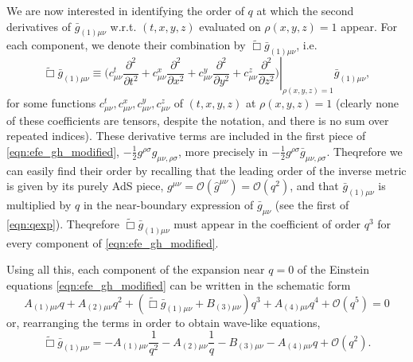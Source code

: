 \documentclass[a4paper,11pt]{article}
\begin{document}
We are now interested in identifying the order of $q$ at which the second derivatives of $ \bar{g}_{(1) \mu \nu}$ w.r.t. $(t,x,y,z)$ evaluated on $\rho(x,y,z)=1$ appear.
For each component, we denote their combination by $\tilde{\Box}\bar{g}_{(1)\mu\nu}$, i.e. 
\begin{equation}
\tilde{\Box}\bar{g}_{(1)\mu\nu}\equiv\left.\biggl(c^t_{\mu\nu}\frac{\partial^2}{\partial t^2}+c^x_{\mu\nu}\frac{\partial^2}{\partial x^2}+c^y_{\mu\nu}\frac{\partial^2}{\partial y^2}+c^z_{\mu\nu}\frac{\partial^2}{\partial z^2}\biggr)\right |_{\rho(x,y,z)=1}\bar{g}_{(1)\mu\nu},
\end{equation}
for some functions $c^t_{\mu\nu},c^x_{\mu\nu},c^y_{\mu\nu},c^z_{\mu\nu}$ of $(t,x,y,z)$ at $\rho(x,y,z)=1$ (clearly none of these coefficients are tensors, despite the notation, and there is no sum over repeated indices).
These derivative terms are included in the first piece of \eqref{eqn:efe_gh_modified}, $-\frac{1}{2}g^{\rho \sigma} g_{\mu \nu, \rho \sigma}$, more precisely in $-\frac{1}{2}g^{\rho \sigma} \bar{g}_{\mu \nu, \rho \sigma}$.
Theqrefore we can easily find their order by recalling that the leading order of the inverse metric is given by its purely AdS piece, $g^{\mu\nu}=\mathcal{O}(\hat{g}^{\mu\nu})=\mathcal{O}(q^{2})$, and that $\bar{g}_{(1)\mu\nu}$ is multiplied by $q$ in the near-boundary expression of $\bar{g}_{\mu\nu}$ (see the first of \eqref{eqn:qexp}). Theqrefore $\tilde{\Box}\bar{g}_{(1)\mu\nu}$ must appear in the coefficient of order $q^{3}$ for every component of \eqref{eqn:efe_gh_modified}.

Using all this, each component of the expansion near $q=0$ of the Einstein equations \eqref{eqn:efe_gh_modified} can be written in the schematic form
\begin{equation}\label{eq:efefullexp}
A_{(1)\mu\nu}q+A_{(2)\mu\nu}q^2+(\tilde{\Box}\bar{g}_{(1)\mu\nu}+B_{(3)\mu\nu})q^3+A_{(4)\mu\nu}q^4+\mathcal{O}(q^5)=0
\end{equation}
or, rearranging the terms in order to obtain wave-like equations,
\begin{equation}
\tilde{\Box}\bar{g}_{(1)\mu\nu}=-A_{(1)\mu\nu}\frac{1}{q^2}-A_{(2)\mu\nu}\frac{1}{q}-B_{(3)\mu\nu}-A_{(4)\mu\nu}q+\mathcal{O}(q^2).
\end{equation}
\end{document}
